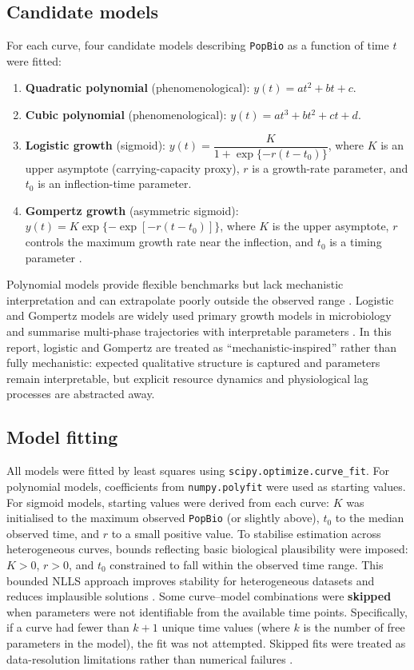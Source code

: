 \documentclass[11pt]{article}
\begin{document}
\subsection*{Candidate models}
For each curve, four candidate models describing \texttt{PopBio} as a function of time \(t\) were fitted:
\begin{enumerate}
\item \textbf{Quadratic polynomial} (phenomenological): \(y(t)=a t^2 + b t + c\).
\item \textbf{Cubic polynomial} (phenomenological): \(y(t)=a t^3 + b t^2 + c t + d\).
\item \textbf{Logistic growth} (sigmoid): \(y(t)=\dfrac{K}{1+\exp\{-r(t-t_0)\}}\), where \(K\) is an upper asymptote (carrying-capacity proxy), \(r\) is a growth-rate parameter, and \(t_0\) is an inflection-time parameter.
\item \textbf{Gompertz growth} (asymmetric sigmoid): \(y(t)=K\exp\{-\exp[-r(t-t_0)]\}\), where \(K\) is the upper asymptote, \(r\) controls the maximum growth rate near the inflection, and \(t_0\) is a timing parameter \citep{Zwietering1990,Buchanan1997}.
\end{enumerate}
Polynomial models provide flexible benchmarks but lack mechanistic interpretation and can extrapolate poorly outside the observed range \citep{MichaCorradini2011}. Logistic and Gompertz models are widely used primary growth models in microbiology and summarise multi-phase trajectories with interpretable parameters \citep{Zwietering1990,MichaCorradini2011}. In this report, logistic and Gompertz are treated as ``mechanistic-inspired'' rather than fully mechanistic: expected qualitative structure is captured and parameters remain interpretable, but explicit resource dynamics and physiological lag processes are abstracted away.
\subsection*{Model fitting}
All models were fitted by least squares using \texttt{scipy.optimize.curve\_fit}. For polynomial models, coefficients from \texttt{numpy.polyfit} were used as starting values. For sigmoid models, starting values were derived from each curve: \(K\) was initialised to the maximum observed \texttt{PopBio} (or slightly above), \(t_0\) to the median observed time, and \(r\) to a small positive value. To stabilise estimation across heterogeneous curves, bounds reflecting basic biological plausibility were imposed: \(K>0\), \(r>0\), and \(t_0\) constrained to fall within the observed time range. This bounded NLLS approach improves stability for heterogeneous datasets and reduces implausible solutions \citep{MotulskyChristopoulos2004,Bolker2013}.
Some curve--model combinations were \textbf{skipped} when parameters were not identifiable from the available time points. Specifically, if a curve had fewer than \(k+1\) unique time values (where \(k\) is the number of free parameters in the model), the fit was not attempted. Skipped fits were treated as data-resolution limitations rather than numerical failures \citep{Bolker2013}.
\end{document}
